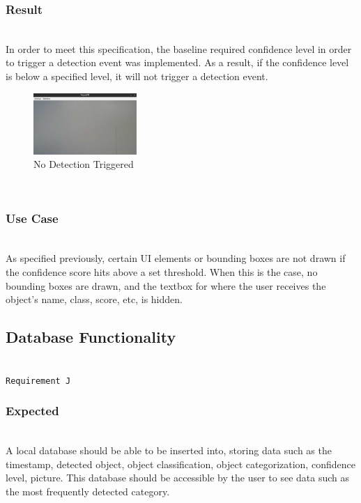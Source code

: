 \documentclass[conference]{IEEEtran}
\begin{document}
\subsubsection{Result}~\\
In order to meet this specification, the baseline required confidence level in order to trigger a detection event was implemented. As a result, if the confidence level is below a specified level, it will not trigger a detection event.

\begin{figure}[!h]
    \centering
    \includegraphics[width=0.35\textwidth]{images/nothing_detected.eps}
    \caption{No Detection Triggered}
\end{figure}~\\

\subsubsection{Use Case}~\\
As specified previously, certain UI elements or bounding boxes are not drawn if the confidence score hits above a set threshold. When this is the case, no bounding boxes are drawn, and the textbox for where the user receives the object's name, class, score, etc, is hidden.~\\

\subsection{Database Functionality}~\\
\texttt{Requirement J}~\\
\subsubsection{Expected}~\\
A local database should be able to be inserted into, storing data such as the timestamp, detected object, object classification, object categorization, confidence level, picture. This database should be accessible by the user to see data such as the most frequently detected category.~\\
\end{document}
